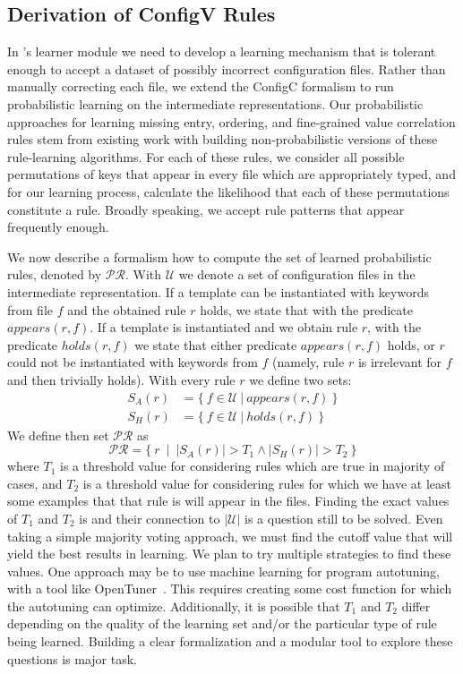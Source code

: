 \subsection{Derivation of ConfigV Rules}
\label{subsec-rules}

In \app's learner module we need to develop a learning mechanism
that is tolerant 
enough to accept a dataset of possibly incorrect configuration files.
Rather than manually correcting each file, 
we extend the ConfigC formalism to run probabilistic learning
on the intermediate representations.
Our probabilistic approaches for learning missing entry, 
ordering, and fine-grained value correlation rules stem 
from existing work with building 
non-probabilistic versions of these rule-learning algorithms. 
For each of these rules, 
we consider all possible permutations of keys that appear in every 
file which are appropriately typed, and for our learning process, calculate the likelihood that each of 
these permutations constitute a rule. 
Broadly speaking, we accept rule patterns that appear frequently enough.

We now describe a formalism how to compute the set of learned
probabilistic rules, denoted by $\mathcal{PR}$.
With $\mathcal{U}$ we denote a set of configuration files in the 
intermediate representation. If a template can be instantiated with
keywords from file $f$ and the obtained rule $r$ holds, we state that with the predicate 
$\mathit{appears}(r,f)$.
If a template is instantiated and we obtain rule $r$, with  the predicate 
$\mathit{holds}(r,f)$ we state that either predicate $\mathit{appears}(r,f)$ holds, or 
$r$ could not be instantiated with keywords from $f$ (namely, rule $r$ is irrelevant 
for $f$ and then trivially holds). With every 
rule $r$ we define two sets:
\begin{align*}
S_A(r)& =\{ \ f \in \mathcal{U}\ | \ \mathit{appears}(r,f)\  \} \\
S_H(r)& =\{ \ f \in \mathcal{U}\  | \ \mathit{holds}(r,f) \ \}
\end{align*}
We define then set $\mathcal{PR}$ as
$$\mathcal{PR} = \{\ r \ \mid \ |S_A(r)| > T_1 \land |S_H(r)| > T_2 \ \} $$
where $T_1$ is a threshold value for considering rules which are true in 
majority of cases, and $T_2$ is a threshold value for considering rules 
for which we have at least some examples that that rule is will 
appear in the files. Finding the exact values of $T_1$ and $T_2$ is 
and their connection to $|\mathcal{U}|$
is a question still to be solved.
Even taking a simple majority voting approach, we must find the cutoff value that will yield the best results in learning.
We plan to try multiple strategies to find these values.
One approach may be to use machine learning for program autotuning, with a tool like OpenTuner~\cite{ansel:pact:2014}.
This requires creating some cost function for which the autotuning can optimize.
Additionally, it is possible that $T_1$ and $T_2$ differ depending on the quality of the learning set and/or the particular type of rule being learned.
Building a clear formalization and a modular tool to explore these questions is major task.

